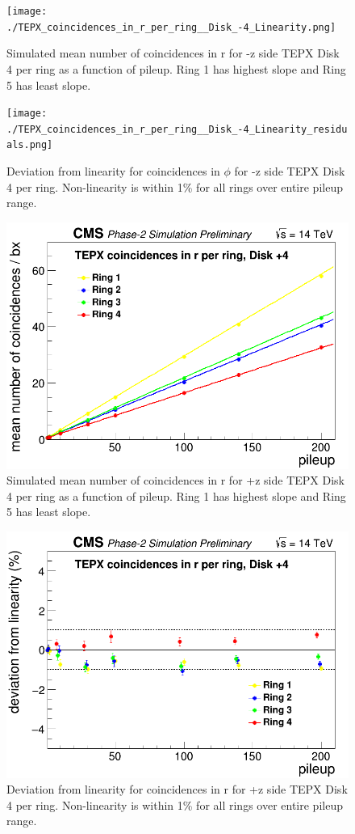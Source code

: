 \begin{figure}[H]
  \centering
  \texttt{[image: ./TEPX\_coincidences\_in\_r\_per\_ring\_\_Disk\_-4\_Linearity.png]}
  \caption{Simulated mean number of coincidences in r for -z side TEPX Disk 4 per ring as a function of pileup. Ring 1 has highest slope and Ring 5 has least slope.}
  \label{fig:CMS}
\end{figure}


\begin{figure}[H]
  \centering
  \texttt{[image: ./TEPX\_coincidences\_in\_r\_per\_ring\_\_Disk\_-4\_Linearity\_residuals.png]}
  \caption{Deviation from linearity for coincidences in $\phi$ for -z side TEPX Disk 4 per ring. Non-linearity is within 1\% for all rings over entire pileup range.}
  \label{fig:CMS}
\end{figure}


\begin{figure}[H]
  \centering
  \includegraphics[width=0.5\columnwidth]{./TEPX_coincidences_in_r_per_ring_mean_number_of_coincidences___bxDisk4_Linearity.png}
  \caption{Simulated mean number of coincidences in r for +z side TEPX Disk 4 per ring as a function of pileup. Ring 1 has highest slope and Ring 5 has least slope.}
  \label{fig:CMS}
\end{figure}


\begin{figure}[H]
  \centering
  \includegraphics[width=0.5\columnwidth]{./TEPX_coincidences_in_r_per_ring_mean_number_of_coincidences___bxDisk4_Linearity_residuals.png}
  \caption{Deviation from linearity for coincidences in r for +z side TEPX Disk 4 per ring. Non-linearity is within 1\% for all rings over entire pileup range.}
  \label{fig:CMS}
\end{figure}
